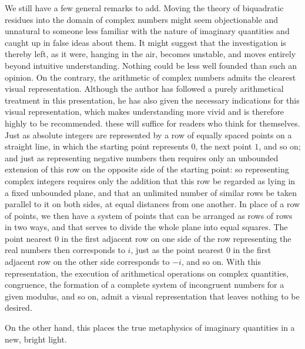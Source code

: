 We still have a few general remarks to add. Moving the theory of biquadratic residues into the domain of complex numbers might seem objectionable and unnatural to someone less familiar with the nature of imaginary quantities and caught up in false ideas about them. It might suggest that the investigation is thereby left, as it were, hanging in the air, becomes unstable, and moves entirely beyond intuitive understanding. Nothing could be less well founded than such an opinion. On the contrary, the arithmetic of complex numbers admits the clearest visual representation. Although the author has followed a purely arithmetical treatment in this presentation, he has also given the necessary indications for this visual representation, which makes understanding more vivid and is therefore highly to be recommended. these will suffice for readers who think for themselves. Just as absolute integers are represented by a row of equally spaced points on a straight line, in which the starting point represents $0$, the next point $1$, and so on; and just as representing negative numbers then requires only an unbounded extension of this row on the opposite side of the starting point: so representing complex integers requires only the addition that this row be regarded as lying in a fixed unbounded plane, and that an unlimited number of similar rows be taken parallel to it on both sides, at equal distances from one another. In place of a row of points, we then have a system of points that can be arranged as rows of rows in two ways, and that serves to divide the whole plane into equal squares. The point nearest $0$ in the first adjacent row on one side of the row representing the real numbers then corresponds to $i$, just as the point nearest $0$ in the first adjacent row on the other side corresponds to $-i$, and so on. With this representation, the execution of arithmetical operations on complex quantities, congruence, the formation of a complete system of incongruent numbers for a given modulus, and so on, admit a visual representation that leaves nothing to be desired.

On the other hand, this places the true metaphysics of imaginary quantities in a new, bright light.


